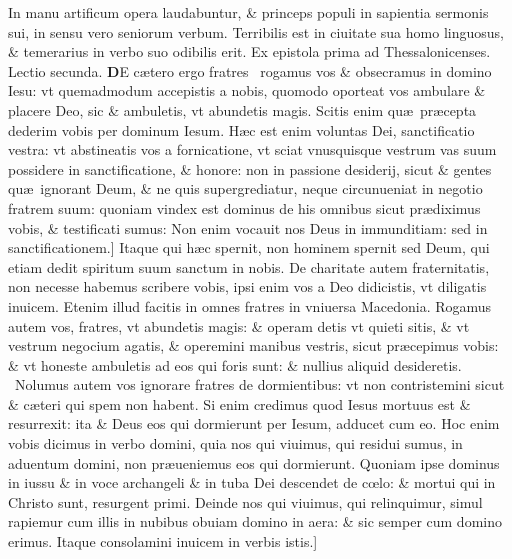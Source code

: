 \documentclass[a5paper,10pt]{book}
\def\leftmarginnote{%
	\lrmarginnote{\hskip -\marginparsep \hskip -6.5em}}
\def\rightmarginnote{%
	\lrmarginnote{\hskip\columnwidth \hskip -1em}}
\def\ae{æ}
\def\oe{œ}
\begin{document}
\begin{multicols*}{2}
In manu artificum opera laudabuntur, \& princeps populi in sapientia sermonis sui, in sensu vero seniorum verbum.
Terribilis est in ciuitate sua homo linguosus, \& temerarius in verbo suo odibilis erit.
\fancyhead[C]{\color{red} Feria. iij. Dominic\ae . iij. Vagantium}
\newline {} \color{red} Ex epistola prima ad Thessalonicenses. \quad Lectio secunda. \color{black}
\vspace{-.25em}
\lettrine[lines=2]{\bfseries \color{red} D}{}E\rightmarginnote{c.4.a} c\ae tero ergo fratres \textdagger \ 
rogamus vos \& obsecramus in domino Iesu: vt quemadmodum accepistis a nobis, quomodo oporteat vos ambulare \& placere Deo, sic \& ambuletis, vt abundetis magis.
Scitis enim qu\ae \ pr\ae cepta dederim vobis per dominum Iesum. H\ae c est enim voluntas Dei, sanctificatio vestra: vt abstineatis vos a fornicatione, vt sciat vnusquisque vestrum vas suum possidere in sanctificatione, \& honore: non in passione desiderij, sicut \& gentes qu\ae \ ignorant Deum, \& ne quis
supergrediatur, neque circunueniat in negotio fratrem suum: quoniam vindex est dominus de his omnibus sicut pr\ae diximus vobis, \& testificati sumus: Non enim vocauit nos Deus in immunditiam: sed in sanctificationem.]
Itaque\leftmarginnote{\begin{flushright}B\end{flushright}} qui h\ae c spernit, non hominem spernit sed Deum, qui etiam dedit spiritum suum sanctum in nobis.
De charitate autem fraternitatis, non necesse habemus scribere vobis, ipsi enim vos a Deo didicistis, vt diligatis inuicem.
Etenim illud facitis in omnes fratres in vniuersa Macedonia. Rogamus autem vos, fratres, vt abundetis magis: \& operam detis vt quieti sitis, \& vt vestrum negocium agatis, \& operemini manibus vestris, sicut pr\ae cepimus vobis: \& vt honeste ambuletis ad eos qui foris sunt: \& nullius aliquid desideretis. \textdagger \ 
Nolumus\leftmarginnote{\begin{flushright}C\end{flushright}} autem vos ignorare fratres de dormientibus: vt non contristemini sicut \& c\ae teri qui spem non habent.
Si enim credimus quod Iesus mortuus est \& resurrexit: ita \& Deus eos qui dormierunt per Iesum, adducet cum eo. Hoc enim vobis dicimus in verbo domini, quia nos qui viuimus, qui residui sumus, in aduentum domini, non pr\ae ueniemus eos qui dormierunt.
Quoniam ipse dominus in iussu \& in voce archangeli \& in tuba Dei descendet de c\oe lo: \& mortui qui in Christo sunt, resurgent primi.
Deinde nos qui viuimus, qui relinquimur, simul rapiemur cum illis in nubibus obuiam domino in aera: \& sic semper cum domino erimus. Itaque consolamini inuicem in verbis istis.]

\end{multicols*}
\end{document}
